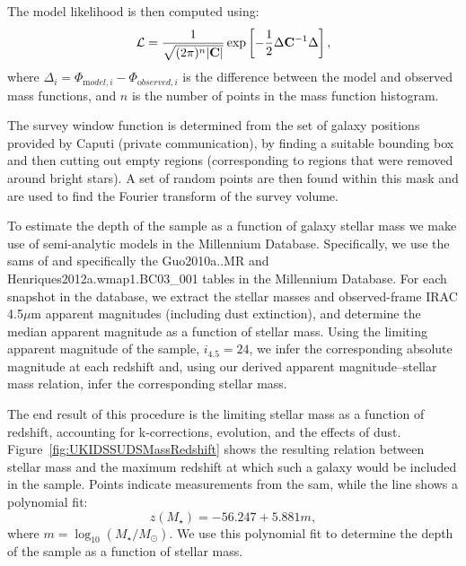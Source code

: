 The model likelihood is then computed using:
\begin{equation}
 \mathcal{L} = {1 \over \sqrt{(2 \pi)^n |{\mathbf C}|}} \exp\left[ -{1\over 2} \Delta {\mathbf C}^{-1} \Delta \right],
\end{equation}
where $\Delta_i = \Phi_{{\mathrm model}, i} - \Phi_{{\mathrm observed}, i}$ is the difference between the model and observed mass functions, and $n$ is the number of points in the mass function histogram.

The survey window function is determined from the set of galaxy positions provided by Caputi (private communication), by finding a suitable bounding box and then cutting out empty regions (corresponding to regions that were removed around bright stars). A set of random points are then found within this mask and are used to find the Fourier transform of the survey volume. 

To estimate the depth of the \cite{caputi_stellar_2011} sample as a function of galaxy stellar mass we make use of semi-analytic models in the Millennium Database. Specifically, we use the \glspl{sam} of \cite{guo_dwarf_2011} and \cite{henriques_confronting_2012} specifically the {\normalfont \ttfamily Guo2010a..MR} and {\normalfont \ttfamily Henriques2012a.wmap1.BC03\_001} tables in the Millennium Database. For each snapshot in the database, we extract the stellar masses and observed-frame IRAC 4.5$\mu$m apparent magnitudes (including dust extinction), and determine the median apparent magnitude as a function of stellar mass. Using the limiting apparent magnitude of the \cite{caputi_stellar_2011} sample, $i_{4.5}=24$, we infer the corresponding absolute magnitude at each redshift and, using our derived apparent magnitude--stellar mass relation, infer the corresponding stellar mass.

The end result of this procedure is the limiting stellar mass as a function of redshift, accounting for k-corrections, evolution, and the effects of dust. Figure~\ref{fig:UKIDSSUDSMassRedshift} shows the resulting relation between stellar mass and the maximum redshift at which such a galaxy would be included in the sample. Points indicate measurements from the \gls{sam}, while the line shows a polynomial fit:
\begin{equation}
 z(M_\star) = -56.247 + 5.881 m,
 \label{eq:UKIDSSUDSDepthPolynomial}
\end{equation}
where $m= \log_{10}(M_\star/M_\odot)$. We use this polynomial fit to determine the depth of the sample as a function of stellar mass.

